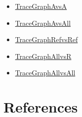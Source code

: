 \documentclass[12pt]{article}
\begin{document}
\begin{itemize}
\item{\hyperref{../../../../traceygraphs/pdcontroller/avsa.svg}{}{}{TraceGraphAvsA}}
\item{\hyperref{../../../../traceygraphs/pdcontroller/avsall.svg}{}{}{TraceGraphAvsAll}}
\item{\hyperref{../../../../traceygraphs/pdcontroller/refvsref.svg}{}{}{TraceGraphRefvsRef}}
\item{\hyperref{../../../../traceygraphs/pdcontroller/allvsr.svg}{}{}{TraceGraphAllvsR}}
\item{\hyperref{../../../../traceygraphs/pdcontroller/allvsall.svg}{}{}{TraceGraphAllvsAll}}
\end{itemize}
\section{References}
\label{Sec:References}
\end{document}
